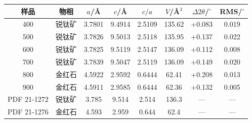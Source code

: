 \begin{tabular}{@{}cccccccc@{}}
\toprule
样品 & 物相 & $a$/Å & $c$/Å & $c/a$ & $V$/Å$^3$ & $\Delta 2\theta$/$^\circ$ & RMS/$^\circ$ \\
\midrule
400 & 锐钛矿 & 3.7801 & 9.4914 & 2.5109 & 135.62 & +0.083 & 0.019 \\
500 & 锐钛矿 & 3.7826 & 9.5013 & 2.5118 & 135.95 & +0.137 & 0.022 \\
600 & 锐钛矿 & 3.7825 & 9.5119 & 2.5147 & 136.09 & +0.112 & 0.008 \\
700 & 锐钛矿 & 3.7839 & 9.5047 & 2.5119 & 136.09 & +0.149 & 0.020 \\
800 & 金红石 & 4.5922 & 2.9592 & 0.6444 & 62.41 & +0.208 & 0.013 \\
900 & 金红石 & 4.5911 & 2.9585 & 0.6444 & 62.36 & +0.132 & 0.005 \\
\midrule
PDF 21-1272 & 锐钛矿 & 3.785 & 9.514 & 2.514 & 136.3 & --- & --- \\
PDF 21-1276 & 金红石 & 4.593 & 2.959 & 0.644 & 62.4 & --- & --- \\
\bottomrule
\end{tabular}
